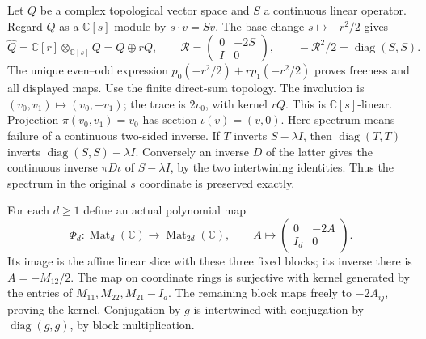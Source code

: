 Let $Q$ be a complex topological vector space and $S$ a continuous
linear operator. Regard $Q$ as a $\mathbb C[s]$-module by $s\cdot v=Sv$.
The base change $s\mapsto-r^2/2$ gives
\[
 \widehat Q=\mathbb C[r]\otimes_{\mathbb C[s]}Q=Q\oplus rQ,\qquad
 \mathcal R=\begin{pmatrix}0&-2S\\I&0\end{pmatrix},\qquad
 -\mathcal R^2/2=\operatorname{diag}(S,S).
\]
The unique even--odd expression
$p_0(-r^2/2)+rp_1(-r^2/2)$ proves freeness and all displayed maps.
Use the finite direct-sum topology.
The involution is $(v_0,v_1)\mapsto(v_0,-v_1)$; the trace is $2v_0$,
with kernel $rQ$. This is $\mathbb C[s]$-linear.
Projection $\pi(v_0,v_1)=v_0$ has section $\iota(v)=(v,0)$.
Here spectrum means failure of a continuous two-sided inverse.
If $T$ inverts $S-\lambda I$, then $\operatorname{diag}(T,T)$
inverts $\operatorname{diag}(S,S)-\lambda I$.
Conversely an inverse $D$ of the latter gives the continuous inverse
$\pi D\iota$ of $S-\lambda I$, by the two intertwining identities.
Thus the spectrum in the original $s$ coordinate is preserved exactly.

For each $d\ge1$ define an actual polynomial map
\begin{equation}\label{eq:matrix-Phi}
 \Phi_d:\operatorname{Mat}_d(\mathbb C)\longrightarrow
 \operatorname{Mat}_{2d}(\mathbb C),\qquad
 A\longmapsto\begin{pmatrix}0&-2A\\I_d&0\end{pmatrix}.
\end{equation}
Its image is the affine linear slice with these three fixed blocks;
its inverse there is $A=-M_{12}/2$.
The map on coordinate rings is surjective with kernel generated by
the entries of $M_{11},M_{22},M_{21}-I_d$.
The remaining block maps freely to $-2A_{ij}$, proving the kernel.
Conjugation by $g$ is intertwined with conjugation by
$\operatorname{diag}(g,g)$, by block multiplication.

